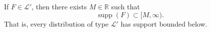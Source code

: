 If $F \in \mathcal{L}'$, then there exists $M \in \mathbb{R}$ such that
$$\operatorname{supp}(F) \subset [M, \infty).$$
That is, every distribution of type $\mathcal{L}'$ has support bounded below.
